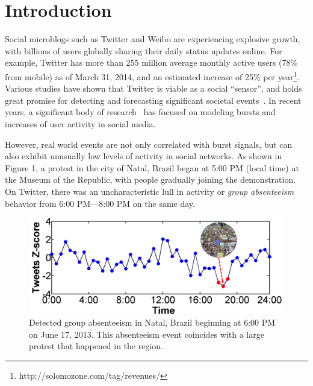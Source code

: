 \section{Introduction} \label{sec:intro}
Social microblogs such as Twitter and Weibo are experiencing explosive growth, with billions of users globally sharing their daily status updates online.
For example, Twitter has more than 255 million average monthly active users (78\% from mobile) as of March 31, 2014, and an estimated increase of 25\% per year\footnote{http://solomozone.com/tag/revenues/}.
Various studies have shown that Twitter is viable as a social ``sensor'', and holds great promise for detecting and forecasting significant societal events~\cite{bugel2013multilingual,sakaki2010earthquake}.
In recent years, a significant body of research~\cite{aggarwal2012event,hong2012discovering,lappas2009burstiness,lappas2012spatiotemporal,sakaki2010earthquake,sayyadi2009event,watanabe2011jasmine,weng2011event,yin2011geographical} has focused on modeling bursts and increases of user activity in social media.

However, real world events are not only correlated with burst signals, but can also exhibit unusually low levels of activity in social networks.
As shown in Figure 1, a protest in the city of Natal, Brazil began at 5:00 PM (local time) at the Museum of the Republic, with people gradually joining the demonstration. %
On Twitter, there was an uncharacteristic lull in activity or {\it group absenteeism} behavior from 6:00 PM---8:00 PM on the same day.



\begin{figure}[t]
\centering
\includegraphics[width=4.5in]{figures/Natal_example1.png}
\caption{Detected group absenteeism in Natal, Brazil beginning at 6:00 PM on June 17, 2013. This absenteeism event coincides with a large protest that happened in the region.}
\label{fig:natal-protest}
\end{figure}


